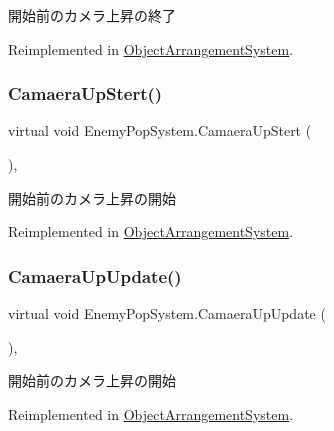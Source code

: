 開始前のカメラ上昇の終了 



Reimplemented in \hyperlink{class_object_arrangement_system_ab4a0e5a7a8e5488cbae90f485bb86e5f}{Object\+Arrangement\+System}.

\mbox{\label{class_enemy_pop_system_a0dff3d5cf8729600043c1875be746eed}} 
\subsubsection{\texorpdfstring{Camaera\+Up\+Stert()}{CamaeraUpStert()}}
{\footnotesize\ttfamily virtual void Enemy\+Pop\+System.\+Camaera\+Up\+Stert (\begin{DoxyParamCaption}{ }\end{DoxyParamCaption})\hspace{0.3cm}{\ttfamily [inline]}, {\ttfamily [virtual]}}



開始前のカメラ上昇の開始 



Reimplemented in \hyperlink{class_object_arrangement_system_a98764c494fecf8dce4726107d4539374}{Object\+Arrangement\+System}.

\mbox{\label{class_enemy_pop_system_af242685f6dfd6d73c04ad284c7ae714c}} 
\subsubsection{\texorpdfstring{Camaera\+Up\+Update()}{CamaeraUpUpdate()}}
{\footnotesize\ttfamily virtual void Enemy\+Pop\+System.\+Camaera\+Up\+Update (\begin{DoxyParamCaption}{ }\end{DoxyParamCaption})\hspace{0.3cm}{\ttfamily [inline]}, {\ttfamily [virtual]}}



開始前のカメラ上昇の開始 



Reimplemented in \hyperlink{class_object_arrangement_system_a7fba170e4af44f3ea4083edebe7e74fc}{Object\+Arrangement\+System}.

